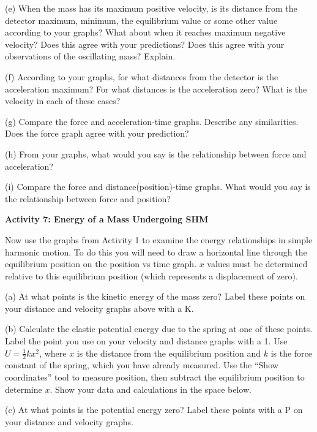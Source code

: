 (e) When the mass has its maximum positive velocity, is its distance from the
detector maximum, minimum, the equilibrium value or some other value according
to your graphs? What about when it reaches maximum negative velocity? Does this
agree with your predictions? Does this agree with your observations of the 
oscillating mass? Explain. 
\answerspace{10mm}

\pagebreak[2]
(f) According to your graphs, for what distances from the detector is the 
acceleration maximum? For what distances is the acceleration zero? What is the 
velocity in each of these cases?
\vspace{20mm}

(g) Compare the force and acceleration-time graphs. Describe any similarities.
Does the force graph agree with your prediction?
\vspace{20mm}

(h) From your graphs, what would you say is the relationship between force and
acceleration? 
\vspace{20mm}

(i) Compare the force and distance(position)-time graphs. What would you say
is the relationship between force and position? 
\vspace{20mm}

\textbf{Activity 7: Energy of a Mass Undergoing SHM }

Now use the graphs from Activity 1 to examine the energy relationships
in simple harmonic motion. To do this you will need to draw a horizontal line through the equilibrium position on the position vs time graph.  $x$ values must be determined relative to this equilibrium position (which represents a displacement of zero).

(a) At what points is the kinetic energy of the mass zero? Label these points
on your distance and velocity graphs above with a K.

(b) Calculate the elastic potential energy due to the spring at one of these
points. Label the point you use on your velocity and distance graphs with a
1. Use $U = \frac{1}{2}kx^{2}$, where  $x$ is the distance from the equilibrium 
position and $k$ is the force constant of the spring, which you have already 
measured. Use the ``Show coordinates''  tool to measure position, then subtract the 
equilibrium position to determine $x$. Show your data and calculations 
in the space below. 
\vspace{25mm}

(c) At what points is the potential energy zero? Label these points with a P
on your distance and velocity graphs.

